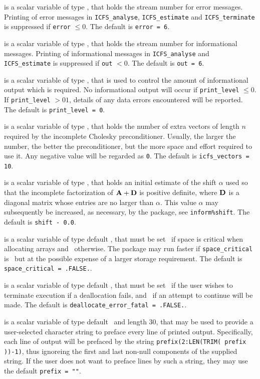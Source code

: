 \documentclass{galahad}
\newcommand{\packagename}{ICFS}
\begin{document}
\begin{description}

 is a scalar variable of type \integer, that holds the
stream number for error messages. Printing of error messages in
{\tt \packagename\_analyse},
{\tt \packagename\_estimate}
and {\tt \packagename\_terminate}
is suppressed if {\tt error} $\leq 0$.
The default is {\tt error = 6}.

 is a scalar variable of type \integer, that holds the
stream number for informational messages. Printing of informational messages in
{\tt \packagename\_analyse} and {\tt \packagename\_estimate}
is suppressed if {\tt out} $< 0$.
The default is {\tt out = 6}.

 is a scalar variable of type \integer, that is used
to control the amount of informational output which is required. No
informational output will occur if {\tt print\_level} $\leq 0$. If
{\tt print\_level} $> 01$, details of any data errors encountered
will be reported.
The default is {\tt print\_level = 0}.

 is a scalar variable of type \integer, that holds
the number of extra vectors of length $n$ required by the
incomplete Cholesky preconditioner.
Usually, the larger the number, the
better the preconditioner, but the more space and effort required to
use it. Any negative value will be regarded as {\tt 0}.
The default is {\tt icfs\_vectors = 10}.

 is a scalar variable of type \realdp, that holds
an initial estimate of the shift $\alpha$ used so that the incomplete
factorization of ${\mathbf{A}} + {\mathbf{D}}$ is positive definite, where ${\mathbf{D}}$ is
a diagonal matrix whose entries are no larger than $\alpha$.
This value $\alpha$ may subsequently be increased, as necessary, by the
package, see {\tt inform\%shift}.
The default is {\tt shift - 0.0}.

 is a scalar variable of type default \logical,
that must be set \true\ if space is critical when allocating arrays
and  \false\ otherwise. The package may run faster if
{\tt space\_critical} is \false\ but at the possible expense of a larger
storage requirement. The default is {\tt space\_critical = .FALSE.}.

 is a scalar variable of type default \logical,
that must be set \true\ if the user wishes to terminate execution if
a deallocation  fails, and \false\ if an attempt to continue
will be made. The default is {\tt deallocate\_error\_fatal = .FALSE.}.

 is a scalar variable of type default \character\
and length 30, that may be used to provide a user-selected
character string to preface every line of printed output.
Specifically, each line of output will be prefaced by the string
{\tt prefix(2:LEN(TRIM( prefix ))-1)},
thus ignoreing the first and last non-null components of the
supplied string. If the user does not want to preface lines by such
a string, they may use the default {\tt prefix = ""}.

\end{description}
\end{document}
